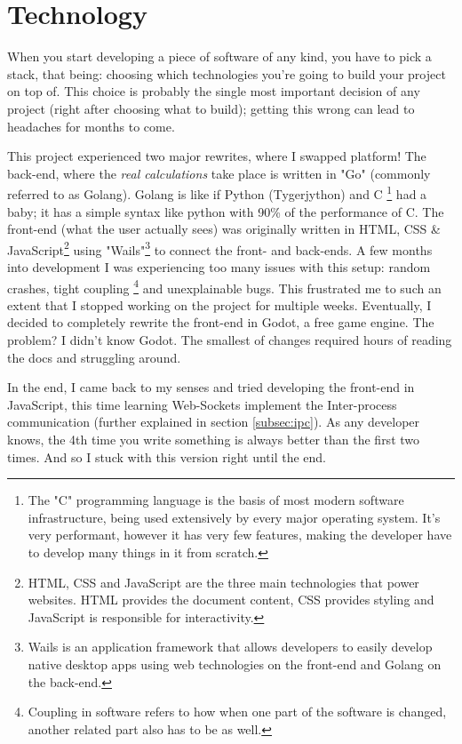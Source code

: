 \section{Technology}
\label{sec:technology}

When you start developing a piece of software of any kind, you have to pick a stack, that being: choosing which
technologies you're going to build your project on top of. This choice is probably the single most important decision of any
project (right after choosing what to build); getting this wrong can lead to headaches for months to come.

This project experienced two major rewrites, where I swapped platform! The back-end, where the \textit{real calculations}
take place is written in "Go" (commonly referred to as Golang). Golang is like if
Python (Tygerjython) and C \footnote{The "C" programming language is the basis of most modern software infrastructure,
	being used extensively by every major operating system. It's very performant, however it has very few features, making the developer have
	to develop many things in it from scratch.} had a baby; it has a simple syntax like python with 90\% of the performance of C.
The front-end (what the user actually sees) was originally written in HTML, CSS \& JavaScript\footnote{
	HTML, CSS and JavaScript are the three main technologies that power websites. HTML provides the document content, CSS provides styling and
	JavaScript is responsible for interactivity.
} using "Wails"\footnote{Wails is an application framework that allows developers to easily develop native desktop apps using
	web technologies on the front-end and Golang on the back-end.} to connect
the front- and back-ends. A few months into development I was experiencing too many issues with this setup: random
crashes, tight coupling \footnote{Coupling in software refers to how when one part of the software is changed, another
	related part also has to be as well. } and unexplainable bugs. This frustrated me to such an extent that I stopped
working on the project for multiple weeks. Eventually, I decided to completely rewrite the front-end in Godot, a free
game engine. The problem? I didn't know Godot. The smallest of changes required hours of reading the docs and struggling
around.

In the end, I came back to my senses and tried developing the front-end in JavaScript, this time learning Web-Sockets implement
the Inter-process communication (further explained in section \ref{subsec:ipc}).
As any developer knows, the 4th time you write something is always better than the first two times. And so I stuck with
this version right until the end.

